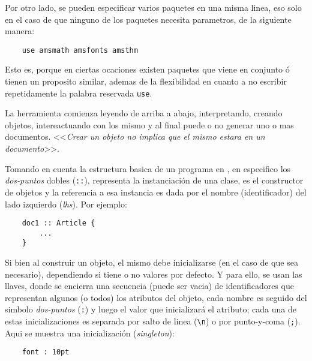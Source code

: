 \documentclass[12pt,letterpaper,titlepage,oneside,openright]{book}
\newcommand{\OhTeX}{%
    \makebox[0.76em][c]{O}%
    \makebox[0.25em][c]{%
        \raisebox{0.14em}[0em][0em]{%
            \fontsize{0.5em}{0cm}%
                \selectfont H%
        }%
    }%
    \makebox[1.35em][c]{\TeX}%
}
\newcommand{\ohtex}{\OhTeX\xspace}
\begin{document}
Por otro lado, se pueden especificar varios paquetes en una misma linea, eso
solo en el caso de que ninguno de los paquetes necesita parametros, de la
siguiente manera:

\begin{center}
\begin{lstlisting}
    use amsmath amsfonts amsthm
\end{lstlisting}
\end{center}

Esto es, porque en ciertas ocaciones existen paquetes que viene en conjunto ó
tienen un proposito similar, ademas de la flexibilidad en cuanto a no escribir
repetidamente la palabra reservada \texttt{use}.

La herramienta comienza leyendo de arriba a abajo, interpretando, creando
objetos, intereactuando con los mismo y al final puede o no generar uno o mas
documentos. <<\textit{Crear un objeto no implica que el mismo estara en un
documento}>>.

Tomando en cuenta la estructura basica de un programa en \ohtex, en especifico
los \textit{dos-puntos} dobles (\texttt{::}), representa la instanciación de
una clase, es el constructor de objetos y la referencia a esa instancia es dada
por el nombre (identificador) del lado izquierdo (\textit{lhs}). Por ejemplo:

\begin{center}
\begin{lstlisting}
    doc1 :: Article {
        ...
    }   
\end{lstlisting}
\end{center}

Si bien al construir un objeto, el mismo debe inicializarse (en el caso de que
sea necesario), dependiendo si tiene o no valores por defecto. Y para ello, se
usan las llaves, donde se encierra una secuencia (puede ser vacia) de
identificadores que representan algunos (o todos) los atributos del objeto, cada
nombre es seguido del simbolo \textit{dos-puntos} (\texttt{:}) y luego el valor
que inicializará el atributo; cada una de estas inicializaciones es separada por
salto de linea (\verb|\n|) o por punto-y-coma (\texttt{;}). Aqui se muestra una
inicialización (\textit{singleton}):

\begin{center}
\begin{lstlisting}
    font : 10pt
\end{lstlisting}
\end{center}
\end{document}
